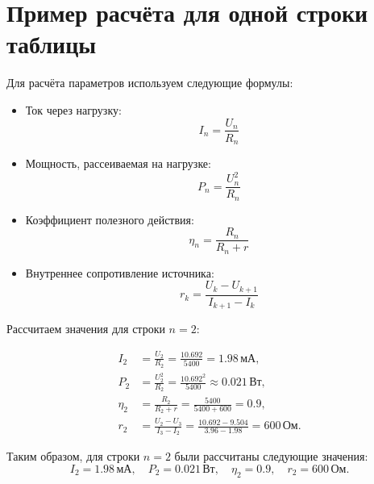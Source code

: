\newpage
\section{Пример расчёта для одной строки таблицы}

Для расчёта параметров используем следующие формулы:

\begin{itemize}
	\item Ток через нагрузку:
	      \[
		      I_n = \frac{U_n}{R_n}
	      \]

	\item Мощность, рассеиваемая на нагрузке:
	      \[
		      P_n = \frac{U_n^2}{R_n}
	      \]

	\item Коэффициент полезного действия:
	      \[
		      \eta_n = \frac{R_n}{R_n + r}
	      \]

	\item Внутреннее сопротивление источника:
	      \[
		      r_k = \frac{U_k - U_{k+1}}{I_{k+1} - I_k}
	      \]
\end{itemize}

Рассчитаем значения для строки \(n = 2\):

\begin{align*}
	I_2    & = \frac{U_2}{R_2} = \frac{10.692}{5400} = 1.98 \, \text{мА},                           \\
	P_2    & = \frac{U_2^2}{R_2} = \frac{10.692^2}{5400} \approx 0.021 \, \text{Вт},                \\
	\eta_2 & = \frac{R_2}{R_2 + r} = \frac{5400}{5400 + 600} = 0.9,                                 \\
	r_2    & = \frac{U_2 - U_3}{I_3 - I_2} = \frac{10.692 - 9.504}{3.96 - 1.98} = 600 \, \text{Ом}.
\end{align*}

Таким образом, для строки \(n = 2\) были рассчитаны следующие значения:
\[
	I_2 = 1.98 \, \text{мА}, \quad P_2 = 0.021 \, \text{Вт}, \quad \eta_2 = 0.9, \quad r_2 = 600 \, \text{Ом}.
\]
